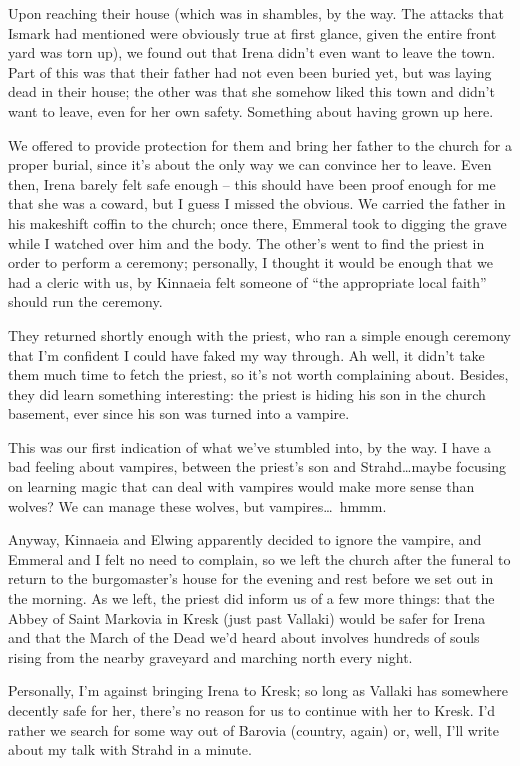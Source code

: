 Upon reaching their house (which was in shambles, by the way. The attacks that Ismark had mentioned were obviously true at first glance, given the entire front yard was torn up), we found out that Irena didn't even want to leave the town. Part of this was that their father had not even been buried yet, but was laying dead in their house; the other was that she somehow liked this town and didn't want to leave, even for her own safety. Something about having grown up here.

We offered to provide protection for them and bring her father to the church for a proper burial, since it's about the only way we can convince her to leave. Even then, Irena barely felt safe enough -- this should have been proof enough for me that she was a coward, but I guess I missed the obvious. We carried the father in his makeshift coffin to the church; once there, Emmeral took to digging the grave while I watched over him and the body. The other's went to find the priest in order to perform a ceremony; personally, I thought it would be enough that we had a cleric with us, by Kinnaeia felt someone of ``the appropriate local faith'' should run the ceremony.

They returned shortly enough with the priest, who ran a simple enough ceremony that I'm confident I could have faked my way through. Ah well, it didn't take them much time to fetch the priest, so it's not worth complaining about. Besides, they did learn something interesting: the priest is hiding his son in the church basement, ever since his son was turned into a vampire.

This was our first indication of what we've stumbled into, by the way. I have a bad feeling about vampires, between the priest's son and Strahd\dots maybe focusing on learning magic that can deal with vampires would make more sense than wolves? We can manage these wolves, but vampires\dots\ hmmm.

Anyway, Kinnaeia and Elwing apparently decided to ignore the vampire, and Emmeral and I felt no need to complain, so we left the church after the funeral to return to the burgomaster's house for the evening and rest before we set out in the morning. As we left, the priest did inform us of a few more things: that the Abbey of Saint Markovia in Kresk (just past Vallaki) would be safer for Irena and that the March of the Dead we'd heard about involves hundreds of souls rising from the nearby graveyard and marching north every night.

Personally, I'm against bringing Irena to Kresk; so long as Vallaki has somewhere decently safe for her, there's no reason for us to continue with her to Kresk. I'd rather we search for some way out of Barovia (country, again) or, well, I'll write about my talk with Strahd in a minute.

